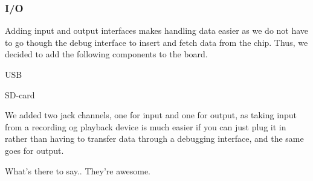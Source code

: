\subsubsection{I/O} Adding input and output interfaces makes handling data easier
as we do not have to go though the debug interface to insert and fetch data from
the chip. Thus, we decided to add the following components to the
board.

 USB 

 SD-card 

 We added two jack channels, one for input and one for
output, as taking input from a recording og playback device is much easier if
you can just plug it in rather than having to transfer data through a debugging
interface, and the same goes for output.

 What's there to say.. They're
awesome.
